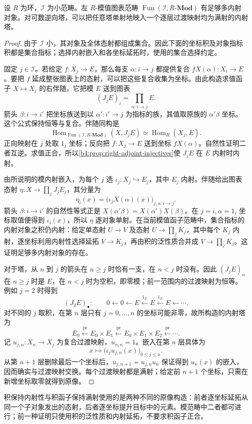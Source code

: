 \begin{proposition}\label{b4:prop:diagram-enough-injectives}
	设 \(R\) 为环，\(\mathcal I\) 为小范畴。左 \(R\)-模值图表范畴 \(\operatorname{Fun}(\mathcal I,R\text{-}\mathbf{Mod})\) 有足够多内射对象。对可数逆向塔，可以把任意塔单射地映入一个逐层过渡映射均为满射的内射塔。
\end{proposition}
\begin{proof}
	由于 \(\mathcal I\) 小，其对象及全体态射都组成集合。因此下面的坐标积及对象指标积都是集合指标；选择内射嵌入和各坐标延拓时，使用的集合选择约定。

	固定 \(j\in\mathcal I\)。若给定 \(f:X_j\to E\)，那么每支 \(\alpha:i\to j\) 都提供复合 \(fX(\alpha):X_i\to E\)。要把 \(f\) 延成整张图表上的态射，可以把这些复合收集为坐标。由此构造求值函子 \(X\mapsto X_j\) 的右伴随，它把模 \(E\) 送到图表
	\[
		(J_jE)_i=\prod_{\alpha:i\to j}E.
	\]
	箭头 \(\beta:i\to i'\) 把坐标族送到以 \(\alpha':i'\to j\) 为指标的族，其值取原族的 \(\alpha'\beta\) 坐标。这个公式保持恒等与复合。伴随同构是
	\[
		\operatorname{Hom}_{\operatorname{Fun}(\mathcal I,R\text{-}\mathbf{Mod})}(X,J_jE) \simeq\operatorname{Hom}_R(X_j,E).
	\]
	正向映射在 \(j\) 处取 \(1_j\) 坐标；反向把 \(f:X_j\to E\) 送到坐标 \(fX(\alpha)\)。自然性证明二者互逆。求值正合，所以\cref{b4:prop:right-adjoint-injectives}使 \(J_jE\) 在 \(E\) 内射时内射。

	由所说明的模内射嵌入，为每个 \(j\) 选 \(\iota_j:X_j\hookrightarrow E_j\)，其中 \(E_j\) 内射。伴随给出图表态射 \(\eta:X\to\prod_jJ_jE_j\)，其分量为
	\[
		\eta_i(x)=\bigl(\iota_jX(\alpha)(x)\bigr)_{j,\alpha:i\to j}.
	\]
	箭头 \(\beta:i\to i'\) 的自然性等式正是 \(X(\alpha'\beta)=X(\alpha')X(\beta)\)。在 \(j=i,\alpha=1_i\) 坐标取值便得到 \(\iota_i(x)\)，所以 \(\eta\) 逐对象单射。在当前模值函子范畴中，集合指标的内射对象之积仍内射：给定单态射 \(U\to V\) 及态射 \(U\to\prod_jK_j\)，其中每个 \(K_j\) 内射，逐坐标利用内射性选择延拓 \(V\to K_j\)，再由积的泛性质合并成 \(V\to\prod_jK_j\)。这证明足够多内射对象的存在。

	对于塔，从 \(n\) 到 \(j\) 的箭头在 \(n\ge j\) 时恰有一支，在 \(n<j\) 时没有。因此 \((J_jE)_n\) 在 \(n\ge j\) 时是 \(E\)，在 \(n<j\) 时为空积，即零模；前一范围内的过渡映射为恒等。例如 \(j=2\) 时得到
	\[
		(J_2E)_\bullet:\qquad 0\xleftarrow{}0\xleftarrow{}E \xleftarrow{1_E}E\xleftarrow{1_E}E\xleftarrow{}\cdots.
	\]
	对不同的 \(j\) 取积，在第 \(n\) 层只有 \(j=0,\ldots,n\) 的坐标可能非零，故所构造的内射塔为
	\[
		E_0\xleftarrow{\operatorname{pr}} E_0\times E_1\xleftarrow{\operatorname{pr}} E_0\times E_1\times E_2\xleftarrow{\operatorname{pr}}\cdots.
	\]
	记 \(u_{j,n}:X_n\to X_j\) 为复合过渡映射，\(u_{n,n}=1\)。嵌入在第 \(n\) 层具体为
	\[
		x\longmapsto\bigl(\iota_j u_{j,n}(x)\bigr)_{0\le j\le n}.
	\]
	从第 \(n+1\) 层删除最后一个坐标后，\(u_{j,n+1}=u_{j,n}u_n\) 保证得到 \(u_n(x)\) 的嵌入，因而确实与过渡映射交换。每个过渡映射都是满射；给定前 \(n+1\) 个坐标，只需在新增坐标取零就得到原像。
\end{proof}

积保持内射性与积函子保持满射使用的是两种不同的原像构造：前者逐坐标延拓从同一个子对象发出的态射，后者逐坐标提升目标中的元素。模范畴中二者都可进行；前一种证明只使用积的泛性质和内射延拓，不要求积函子正合。
